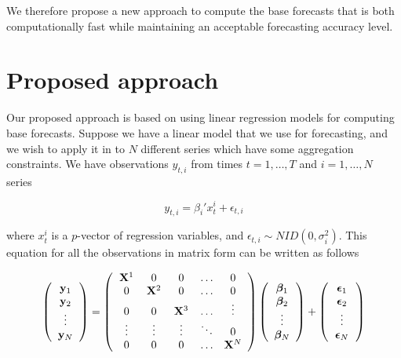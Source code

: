 \documentclass[11pt,a4paper,]{article}
\begin{document}
We therefore propose a new approach to compute the base forecasts that
is both computationally fast while maintaining an acceptable forecasting
accuracy level.

\section{Proposed approach}\label{proposed-approach}

Our proposed approach is based on using linear regression models for
computing base forecasts. Suppose we have a linear model that we use for
forecasting, and we wish to apply it in to \(N\) different series which
have some aggregation constraints. We have observations \(y_{t,i}\) from
times \(t=1,\dots,T\) and \(i=1,\dots,N\) series

\begin{equation}
y_{t,i} = \beta_{i}' x_{t}^i + \epsilon_{t,i}
\end{equation}

where \(x_{t}^{i}\) is a \(p\)-vector of regression variables, and
\(\epsilon_{t,i}\sim NID(0,\sigma_i^2)\). This equation for all the
observations in matrix form can be written as follows

\begin{equation}\label{eq:linearmodel}
\left(\begin{array}{c} 
{\bf{y}}_1\\
{\bf{y}}_2\\
\vdotswithin{\ldots}\\
{\bf{y}}_N
\end{array}\right)= %
\left(\begin{array}{ccccc} 
{\bf{X}}^1 & 0 & 0 & \dots & 0\\
0 & {\bf{X}}^2 & 0 & \dots & 0\\
0 & 0 & {\bf{X}}^3 & \dots & \vdotswithin{\ddots}\\
\vdotswithin{\ddots} & \vdotswithin{\ddots} & \vdotswithin{\ddots} & \ddots & 0\\
0 & 0 & 0 & \dots & {\bf{X}}^N
\end{array}\right)
\left(\begin{array}{c} 
{\bm{\beta}}_1\\
{\bm{\beta}}_2\\
\vdotswithin{\ldots}\\
{\bm{\beta}}_N
\end{array}\right)+
\left(\begin{array}{c} 
{\bm{\epsilon}}_1\\
{\bm{\epsilon}}_2\\
\vdotswithin{\ldots}\\
{\bm{\epsilon}}_N
\end{array}\right)
\end{equation}
\end{document}
